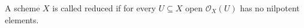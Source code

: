 A scheme $X$ is called reduced if for every $U \subseteq X$ open $\mathcal{O}_X(U)$
has no nilpotent elements.
